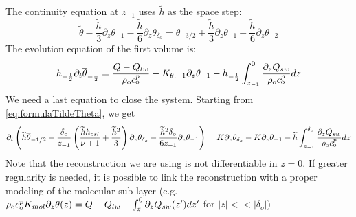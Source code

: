 The continuity equation at $z_{-1}$
uses $\widetilde{h}$
as the space step:
\begin{equation}
    \widetilde{\theta}
    - \frac{\widetilde{h}}{3}
    \partial_z \theta_{-1}
    - \frac{\widetilde{h}}{6}
    \partial_z \theta_{\delta_o}
    = \overline{\theta}_{-3/2}
    + \frac{\widetilde{h}}{3}
    \partial_z \theta_{-1}
    + \frac{\widetilde{h}}{6}
    \partial_z \theta_{-2}
\end{equation}
The evolution equation of the first volume is:
\begin{equation}
h_{-\frac{1}{2}}\partial_t
\overline{\theta}_{-\frac{1}{2}} =
	\frac{Q - Q_{lw}}{\rho_{\rm o} c_{\rm o}^p}
- K_{\theta, -1} \partial_z \theta_{-1}
- h_{-\frac{1}{2}}\int_{z_{-1}}^0
	\frac{\partial_z Q_{sw}}{\rho_{\rm o} c_{\rm o}^p} dz
\end{equation}
We need a last equation to close the system.
Starting from \eqref{eq:formulaTildeTheta}, we get
\begin{equation}
\partial_t
\left(
\widetilde{h}\overline{\theta}_{-1/2}
	-\frac{\delta_o}{z_{-1}}\left(
\frac{\widetilde{h}h_{osl}}{\nu+1} + \frac{\widetilde{h}^2}{3}
\right)\partial_z \theta_{\delta_o}
	- \frac{\widetilde{h}^2\delta_o}{6z_{-1}}
\partial_z \theta_{-1}
\right)
	= K\partial_z \theta_{\delta_o}-
K\partial_z \theta_{-1}
- \widetilde{h}
\int^{\delta_o}_{z_{-1}}
	\frac{\partial_z Q_{sw}}{\rho_{\rm o} c_{\rm o}^p} dz
\end{equation}
Note that the reconstruction we are using is not differentiable
in $z=0$.
If greater regularity is needed, it is possible to link
the reconstruction with a proper modeling of the molecular sub-layer
(e.g. $\rho_{\rm o} c_{\rm o}^p K_{mol} \partial_z \theta(z) =
Q - Q_{lw} - \int_z^0 \partial_z Q_{sw}(z')dz'$ for $|z|<<|\delta_o|$)
